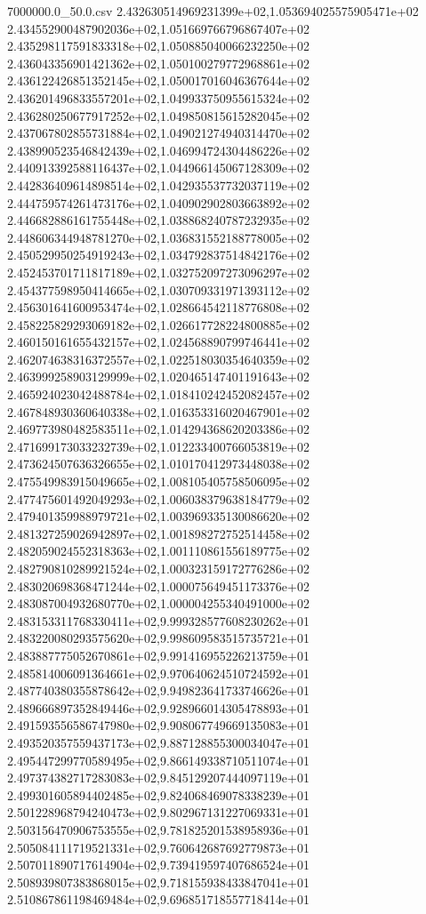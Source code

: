\begin{filecontents*}{7000000.0_50.0.csv}
2.432630514969231399e+02,1.053694025575905471e+02
2.434552900487902036e+02,1.051669766796867407e+02
2.435298117591833318e+02,1.050885040066232250e+02
2.436043356901421362e+02,1.050100279772968861e+02
2.436122426851352145e+02,1.050017016046367644e+02
2.436201496833557201e+02,1.049933750955615324e+02
2.436280250677917252e+02,1.049850815615282045e+02
2.437067802855731884e+02,1.049021274940314470e+02
2.438990523546842439e+02,1.046994724304486226e+02
2.440913392588116437e+02,1.044966145067128309e+02
2.442836409614898514e+02,1.042935537732037119e+02
2.444759574261473176e+02,1.040902902803663892e+02
2.446682886161755448e+02,1.038868240787232935e+02
2.448606344948781270e+02,1.036831552188778005e+02
2.450529950254919243e+02,1.034792837514842176e+02
2.452453701711817189e+02,1.032752097273096297e+02
2.454377598950414665e+02,1.030709331971393112e+02
2.456301641600953474e+02,1.028664542118776808e+02
2.458225829293069182e+02,1.026617728224800885e+02
2.460150161655432157e+02,1.024568890799746441e+02
2.462074638316372557e+02,1.022518030354640359e+02
2.463999258903129999e+02,1.020465147401191643e+02
2.465924023042488784e+02,1.018410242452082457e+02
2.467848930360640338e+02,1.016353316020467901e+02
2.469773980482583511e+02,1.014294368620203386e+02
2.471699173033232739e+02,1.012233400766053819e+02
2.473624507636326655e+02,1.010170412973448038e+02
2.475549983915049665e+02,1.008105405758506095e+02
2.477475601492049293e+02,1.006038379638184779e+02
2.479401359988979721e+02,1.003969335130086620e+02
2.481327259026942897e+02,1.001898272752514458e+02
2.482059024552318363e+02,1.001110861556189775e+02
2.482790810289921524e+02,1.000323159172776286e+02
2.483020698368471244e+02,1.000075649451173376e+02
2.483087004932680770e+02,1.000004255340491000e+02
2.483153311768330411e+02,9.999328577608230262e+01
2.483220080293575620e+02,9.998609583515735721e+01
2.483887775052670861e+02,9.991416955226213759e+01
2.485814006091364661e+02,9.970640624510724592e+01
2.487740380355878642e+02,9.949823641733746626e+01
2.489666897352849446e+02,9.928966014305478893e+01
2.491593556586747980e+02,9.908067749669135083e+01
2.493520357559437173e+02,9.887128855300034047e+01
2.495447299770589495e+02,9.866149338710511074e+01
2.497374382717283083e+02,9.845129207444097119e+01
2.499301605894402485e+02,9.824068469078338239e+01
2.501228968794240473e+02,9.802967131227069331e+01
2.503156470906753555e+02,9.781825201538958936e+01
2.505084111719521331e+02,9.760642687692779873e+01
2.507011890717614904e+02,9.739419597407686524e+01
2.508939807383868015e+02,9.718155938433847041e+01
2.510867861198469484e+02,9.696851718557718414e+01

\end{filecontents*}
